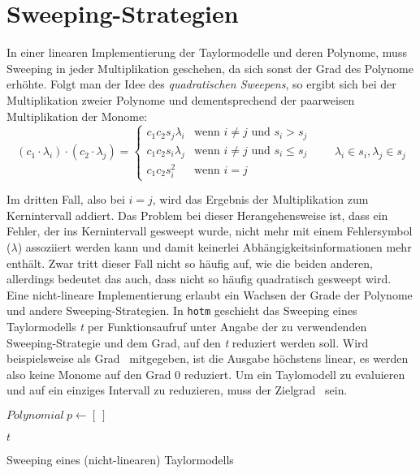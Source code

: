 \section{Sweeping-Strategien}
In einer linearen Implementierung der Taylormodelle und deren Polynome, muss Sweeping in jeder Multiplikation geschehen, da sich sonst der Grad des Polynome erhöhte. Folgt man der Idee des \textit{quadratischen Sweepens}, so ergibt sich bei der Multiplikation zweier Polynome und dementsprechend der paarweisen Multiplikation der Monome: 
$$(c_1 \cdot \lambda_i) \cdot (c_2 \cdot \lambda_j) = \begin{cases}

c_1 c_2 s_j \lambda_i & \text{wenn } i \neq j \text{ und } s_i > s_j \\
c_1 c_2 s_i \lambda_j & \text{wenn } i \neq j \text{ und } s_i \leq s_j \\
c_1 c_2 s_i^2 & \text{wenn } i = j
\end{cases} \quad \quad \lambda_i \in s_i, \lambda_j \in s_j $$

Im dritten Fall, also bei $i = j$, wird das Ergebnis der Multiplikation zum Kernintervall addiert. Das Problem bei dieser Herangehensweise ist, dass ein Fehler, der ins Kernintervall gesweept wurde, nicht mehr mit einem Fehlersymbol ($\lambda$) assoziiert werden kann und damit keinerlei Abhängigkeitsinformationen mehr enthält. Zwar tritt dieser Fall nicht so häufig auf, wie die beiden anderen, allerdings bedeutet das auch, dass nicht so häufig quadratisch gesweept wird. Eine nicht-lineare Implementierung erlaubt ein Wachsen der Grade der Polynome und andere Sweeping-Strategien. In \verb+hotm+ geschieht das Sweeping eines Taylormodells \textit{t} per Funktionsaufruf unter Angabe der zu verwendenden Sweeping-Strategie und dem Grad, auf den \textit{t} reduziert werden soll. Wird beispielsweise als Grad \grqq\ mitgegeben, ist die Ausgabe höchstens linear, es werden also keine Monome auf den Grad 0 reduziert. Um ein Taylomodell zu evaluieren und auf ein einziges Intervall zu reduzieren, muss der Zielgrad \grqq\ sein.

\begin{algorithm}
\SetAlgoLined
\label{algo:mult}
$Polynomial\ p \gets [\ ]$\;


\Return $t$

 \caption{Sweeping eines (nicht-linearen) Taylormodells}
\end{algorithm}

